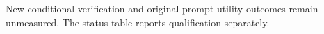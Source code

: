 New conditional verification and original-prompt utility outcomes remain unmeasured. The status table reports qualification separately.
